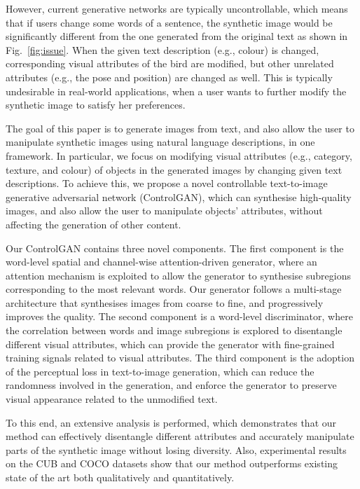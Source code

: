 \documentclass{article}
\begin{document}
However, current generative networks are typically uncontrollable, which means that if users change some words of a sentence, the synthetic image would be significantly different from the one generated from the original text as shown in Fig.~\ref{fig:issue}. When the given text description (e.g., colour) is changed, corresponding visual attributes of the bird are modified, but other unrelated attributes (e.g., the pose and position) are changed as well. This is typically undesirable in real-world applications, when a user wants to further modify the synthetic image to satisfy her preferences.

The goal of this paper is to generate images from text, and also allow the user to manipulate synthetic images using natural language descriptions, in one framework. In particular, we focus on modifying visual attributes (e.g., category, texture, and colour) of objects in the generated images by changing given text descriptions.
To achieve this, we propose a novel controllable text-to-image generative adversarial network (ControlGAN),
which can synthesise high-quality images, and also allow the user to manipulate objects' attributes, without affecting the generation of other content.


Our ControlGAN contains three novel components. 
The first component is the word-level spatial and channel-wise attention-driven generator, where an attention mechanism is exploited to allow the generator to synthesise subregions corresponding to the most relevant words. Our generator follows a multi-stage architecture \cite{xu2018attngan, zhang2018stackgan++} that synthesises images from coarse to fine, and progressively improves the quality. 
The second component is a word-level discriminator, where the correlation between words and image subregions is explored to disentangle different visual attributes, {which} can provide the generator with fine-grained training signals related to visual attributes.
The third component is the adoption of the perceptual loss \cite{johnson2016perceptual} in text-to-image generation, which can reduce the randomness involved in the generation, 
and enforce the generator to preserve visual appearance related to the unmodified text. 

To this end, an extensive analysis is performed, which demonstrates that our method can effectively disentangle different attributes and accurately manipulate parts of the synthetic image without losing diversity. Also, experimental results on the CUB \cite{wah2011caltech} and COCO \cite{lin2014microsoft} datasets show that our method outperforms existing state of the art both qualitatively and quantitatively.
\end{document}
